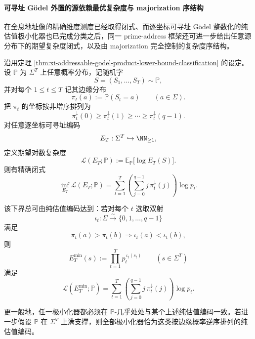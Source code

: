 \paragraph{可寻址 Gödel 外置的源依赖最优复杂度与 majorization 序结构}
在全息地址像的精确维度测度已经取得闭式、而逐坐标可寻址 Gödel 整数化的纯估值极小化器也已完成分类之后，同一 prime-address 框架还可进一步给出任意源分布下的期望复杂度闭式，以及由 majorization 完全控制的复杂度序结构。

\begin{theorem}\label{thm:xi-time-part62dd-addressable-godel-expected-complexity-source-optimality}
沿用定理 \ref{thm:xi-addressable-godel-product-lower-bound-classification} 的设定。设 \(\mathbb P\) 为 \(\Sigma^T\) 上任意概率分布，记随机字
\[
S=(S_1,\dots,S_T)\sim \mathbb P,
\]
并对每个 \(1\le t\le T\) 记其边缘分布
\[
\pi_t(a):=\mathbb P(S_t=a)
\qquad (a\in\Sigma).
\]
把 \(\pi_t\) 的坐标按非增序排列为
\[
\pi_t^\downarrow(0)\ge \pi_t^\downarrow(1)\ge \cdots \ge \pi_t^\downarrow(q-1).
\]
对任意逐坐标可寻址编码
\[
E_T:\Sigma^T\hookrightarrow \NN_{\ge 1},
\]
定义期望对数复杂度
\[
\mathcal L(E_T;\mathbb P):=\mathbb E_{\mathbb P}\bigl[\log E_T(S)\bigr].
\]
则有精确闭式
\[
\inf_{E_T}\mathcal L(E_T;\mathbb P)
=
\sum_{t=1}^{T}
\left(
\sum_{j=0}^{q-1}j\,\pi_t^\downarrow(j)
\right)\log p_t.
\]

该下界总可由纯估值编码达到：若对每个 \(t\) 选取双射
\[
\iota_t:\Sigma\xrightarrow{\sim}\{0,1,\dots,q-1\}
\]
满足
\[
\pi_t(a)>\pi_t(b)\Longrightarrow \iota_t(a)<\iota_t(b),
\]
则
\[
E_T^{\min}(s):=\prod_{t=1}^{T}p_t^{\,\iota_t(s_t)}
\qquad (s\in\Sigma^T)
\]
满足
\[
\mathcal L(E_T^{\min};\mathbb P)
=
\sum_{t=1}^{T}
\left(
\sum_{j=0}^{q-1}j\,\pi_t^\downarrow(j)
\right)\log p_t.
\]

更一般地，任一极小化器都必须在 \(\mathbb P\)-几乎处处与某个上述纯估值编码一致。若进一步假设 \(\mathbb P\) 在 \(\Sigma^T\) 上满支撑，则全部极小化器恰为这类按边缘概率逆序排列的纯估值编码。
\end{theorem}
